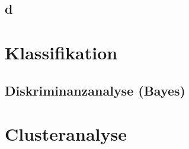 \documentclass[10pt]{article}
\begin{document}
\subsection{d}




\section{Klassifikation}

\subsection{Diskriminanzanalyse (Bayes)}

\section{Clusteranalyse}
\end{document}
